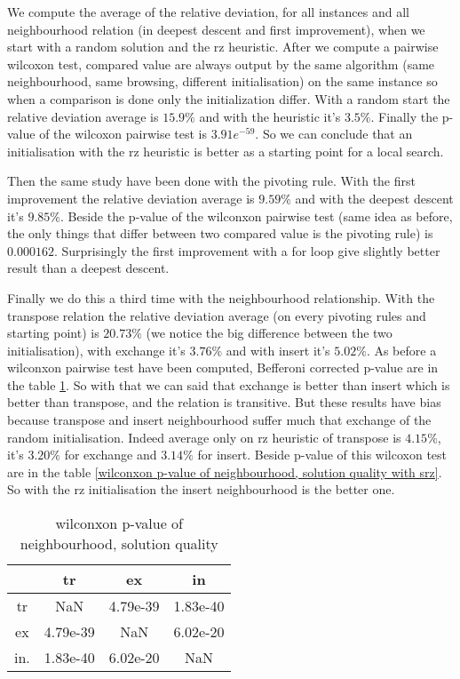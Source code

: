 \documentclass[12pt,a4paper]{article}
\begin{document}
We compute the average of the relative deviation, for all instances and all neighbourhood relation (in deepest descent and first improvement), when we start with a random solution and the rz heuristic. After we compute a pairwise wilcoxon test, compared value are always output by the same algorithm (same neighbourhood, same browsing, different initialisation) on the same instance so when a comparison is done only the initialization differ. With a random start the relative deviation average is $15.9 \%$ and with the heuristic it's $3.5 \%$. Finally the p-value of the wilcoxon pairwise test is $3.91e^{-59}$. So we can conclude that an initialisation with the rz heuristic is better as a starting point for a local search.

Then the same study have been done with the pivoting rule. With the first improvement the relative deviation average is $9.59 \%$ and with the deepest descent it's $9.85 \%$. Beside the p-value of the wilconxon pairwise test (same idea as before, the only things that differ between two compared value is the pivoting rule) is $0.000162$. Surprisingly the first improvement with a for loop give slightly better result than a deepest descent.

Finally we do this a third time with the neighbourhood relationship. With the transpose relation the relative deviation average (on every pivoting rules and starting point) is $20.73 \%$ (we notice the big difference between the two initialisation), with exchange it's $3.76 \%$ and with insert it's $5.02 \%$.
As before a wilconxon pairwise test have been computed, Befferoni corrected p-value are in the table \ref{wilconxon p-value of neighbourhood, solution quality}. So with that we can said that exchange is better than insert which is better than transpose, and the relation is transitive. But these results have bias because transpose and insert neighbourhood suffer much that exchange of the random initialisation. Indeed average only on rz heuristic of transpose is $4.15 \%$, it's $3.20 \%$ for exchange and $3.14 \%$ for insert. Beside p-value of this wilcoxon test are in the table \ref{wilconxon p-value of neighbourhood, solution quality with srz}. So with the rz initialisation the insert neighbourhood is the better one.

\begin{table}[!h]
\centering
\begin{tabular}{|*{4}{c|}}
  \hline
   & tr & ex & in\\
  \hline
tr & NaN & 4.79e-39 & 1.83e-40 \\
ex & 4.79e-39 & NaN & 6.02e-20 \\
in. & 1.83e-40 & 6.02e-20 & NaN \\
  \hline
\end{tabular}
\caption{wilconxon p-value of neighbourhood, solution quality}
\label{wilconxon p-value of neighbourhood, solution quality}
\end{table}
\end{document}
